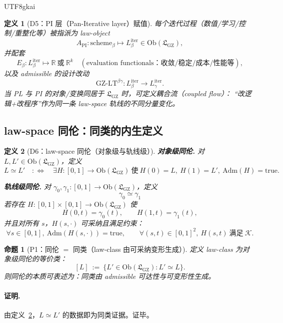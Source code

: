 \documentclass[12pt]{article}
\newtheorem{definition}{定义}[section]
\newtheorem{proposition}{命题}[section]
\begin{document}
\begin{CJK*}{UTF8}{gkai}
\begin{definition}[D5：PI 层（Pan-Iterative layer）赋值]
\label{def:tex19-appB-D5-pi}
每个迭代过程（数值/学习/控制/重整化等）被指派为 law-object
\[
A_{\mathrm{PI}}:\mathrm{scheme}_\beta\mapsto L^{\mathrm{iter}}_\beta\in \mathrm{Ob}(\mathfrak{L}_{\mathrm{GZ}}),
\]
并配套
\[
E_\beta:L^{\mathrm{iter}}_\beta\mapsto \mathbb{R}\ \text{或}\ \mathbb{R}^k
\quad(\text{evaluation functionals：收敛/稳定/成本/性能等}),
\]
以及 admissible 的设计改动
\[
\mathrm{GZ\text{-}LT}^{\beta\gamma}:L^{\mathrm{iter}}_\beta\to L^{\mathrm{iter}}_\gamma.
\]
当 PL 与 PI 的对象/变换同居于 $\mathfrak{L}_{\mathrm{GZ}}$ 时，可定义耦合流（coupled flow）：
“改逻辑+改程序”作为同一条 law-space 轨线的不同分量变化。
\end{definition}

\subsection{law-space 同伦：同类的内生定义}
\label{subsec:tex19-appB-lawspace-homotopy}

\begin{definition}[D6：law-space 同伦（对象级与轨线级）]
\label{def:tex19-appB-D6-homotopy}
\noindent\textbf{对象级同伦.}
对 $L,L'\in \mathrm{Ob}(\mathfrak{L}_{\mathrm{GZ}})$，定义
\[
L\simeq L'
\quad:\Longleftrightarrow\quad
\exists H:[0,1]\to \mathrm{Ob}(\mathfrak{L}_{\mathrm{GZ}})\ \text{使}\ H(0)=L,\ H(1)=L',\ \mathrm{Adm}(H)=\mathrm{true}.
\]

\par\noindent\textbf{轨线级同伦.}
对 $\gamma_0,\gamma_1:[0,1]\to \mathrm{Ob}(\mathfrak{L}_{\mathrm{GZ}})$，定义
\[
\gamma_0\simeq \gamma_1
\]
若存在 $H:[0,1]\times[0,1]\to \mathrm{Ob}(\mathfrak{L}_{\mathrm{GZ}})$ 使
\[
H(0,t)=\gamma_0(t),\qquad H(1,t)=\gamma_1(t),
\]
并且对所有 $s$，$H(s,\cdot)$ 可采纳且满足约束：
\[
\forall s\in[0,1],\ \mathrm{Adm}(H(s,\cdot))=\mathrm{true},
\qquad
\forall (s,t)\in[0,1]^2,\ H(s,t)\ \text{满足}\ \mathcal{K}.
\]
\end{definition}

\begin{proposition}[P1：同伦 $=$ 同类（law-class 由可采纳变形生成）]
\label{prop:tex19-appB-P1-homotopy-class}
定义 law-class 为对象级同伦的等价类：
\[
[L]\ :=\ \{L'\in \mathrm{Ob}(\mathfrak{L}_{\mathrm{GZ}}):L'\simeq L\}.
\]
则同伦的本质可表述为：同类由 admissible 可达性与可变形性生成。
\end{proposition}

\paragraph{证明.}
由定义~\ref{def:tex19-appB-D6-homotopy}，$L\simeq L'$ 的数据即为同类证据。证毕。


\end{CJK*}
\end{document}
